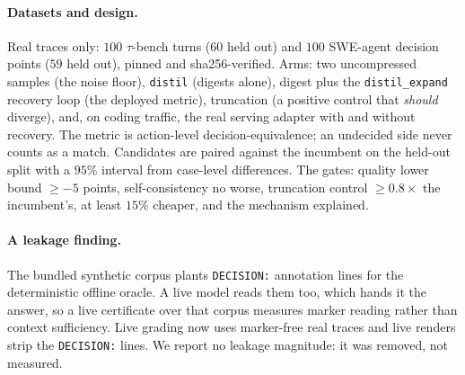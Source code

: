 \documentclass[11pt]{article}
\begin{document}
\paragraph{Datasets and design.} Real traces only: $100$ $\tau$-bench turns ($60$ held out) and
$100$ SWE-agent decision points ($59$ held out), pinned and sha256-verified. Arms: two
uncompressed samples (the noise floor), \texttt{distil} (digests alone), digest plus the
\texttt{distil\_expand} recovery loop (the deployed metric), truncation (a positive control that
\emph{should} diverge), and, on coding traffic, the real serving adapter with and without
recovery. The metric is action-level decision-equivalence; an undecided side never counts as a
match. Candidates are paired against the incumbent on the held-out split with a $95\%$ interval
from case-level differences. The gates: quality lower bound $\ge -5$ points, self-consistency no
worse, truncation control $\ge 0.8\times$ the incumbent's, at least $15\%$ cheaper, and the
mechanism explained.

\paragraph{A leakage finding.} The bundled synthetic corpus plants \texttt{DECISION:} annotation
lines for the deterministic offline oracle. A live model reads them too, which hands it the
answer, so a live certificate over that corpus measures marker reading rather than context
sufficiency. Live grading now uses marker-free real traces and live renders strip the
\texttt{DECISION:} lines. We report no leakage magnitude: it was removed, not measured.
\end{document}
